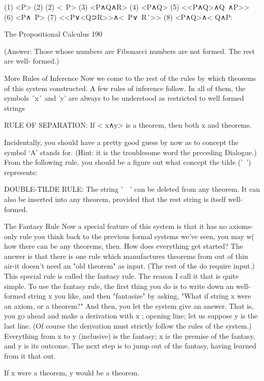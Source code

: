        (1) <P>
       (2) (2) <~P>
       (3) <P∧Q∧R>
       (4) <P∧Q>
       (5) <<P∧Q>∧Q~∧P>>
       (6) <P∧~P>
       (7) <<P∨<Q⊃R>>∧<~P∨~R´>>
       (8) <P∧Q>∧< Q∧P:

The Propositional Calculus                                                              190

(Answer: Those whose numbers are Fibonacci numbers are not formed. The rest are well-
formed.)

                               More Rules of Inference
Now we come to the rest of the rules by which theorems of this system constructed. A
few rules of inference follow. In all of them, the symbols ´x´ and 'y' are always to be
understood as restricted to well formed strings

RULE OF SEPARATION: If < x∧y> is a theorem, then both x and theorems.

Incidentally, you should have a pretty good guess by now as to concept the symbol `A'
stands for. (Hint: it is the troublesome word the preceding Dialogue.) From the following
rule, you should be a figure out what concept the tilde ('~') represents:

DOUBLE-TILDE RULE: The string '~~' can be deleted from any theorem. It can also be
inserted into any theorem, provided that the rest string is itself well-formed.


                                   The Fantasy Rule
Now a special feature of this system is that it has no axioms-only rule you think back to
the previous formal systems we've seen, you may w( how there can be any theorems,
then. How does everything get started? The answer is that there is one rule which
manufactures theorems from out of thin air-it doesn't need an "old theorem" as input.
(The rest of the do require input.) This special rule is called the fantasy rule. The reason I
call it that is quite simple.
         To use the fantasy rule, the first thing you do is to write down an well-formed
string x you like, and then "fantasize" by asking, "What if string x were an axiom, or a
theorem?" And then, you let the system give an answer. That is, you go ahead and make a
derivation with x ; opening line; let us suppose y is the last line. (Of course the derivation
must strictly follow the rules of the system.) Everything from x to y (inclusive) is the
fantasy; x is the premise of the fantasy, and y is its outcome. The next step is to jump out
of the fantasy, having learned from it that out.

                        If x were a theorem, y would be a theorem.

